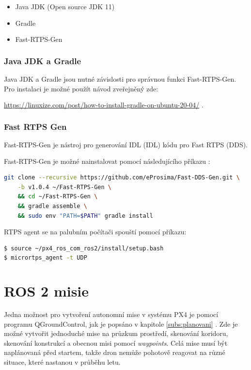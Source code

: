\begin{itemize}
    \item Java JDK (Open source JDK 11)
    \item Gradle
    \item Fast-RTPS-Gen
\end{itemize}

\subsubsection{Java JDK a Gradle}

Java JDK a Gradle jsou nutné závislosti pro správnou funkci Fast-RTPS-Gen. Pro instalaci je možné použít návod zveřejněný zde: 

\href{https://linuxize.com/post/how-to-install-gradle-on-ubuntu-20-04/}{https://linuxize.com/post/how-to-install-gradle-on-ubuntu-20-04/} \cite{GRADLE}.

\subsubsection{Fast RTPS Gen}

Fast-RTPS-Gen je nástroj pro generování \acs{IDL} (\acl{IDL}) kódu pro Fast RTPS (\acs{DDS}).

Fast-RTPS-Gen je možné nainstalovat pomocí následujícího příkazu \cite{DDSGEN}:

\begin{lstlisting}[language=bash]
git clone --recursive https://github.com/eProsima/Fast-DDS-Gen.git \
    -b v1.0.4 ~/Fast-RTPS-Gen \
    && cd ~/Fast-RTPS-Gen \
    && gradle assemble \
    && sudo env "PATH=$PATH" gradle install
\end{lstlisting}

\acs{RTPS} agent se na palubním počítači spouští pomocí příkazu:

\begin{lstlisting}[language=bash]
$ source ~/px4_ros_com_ros2/install/setup.bash
$ micrortps_agent -t UDP
\end{lstlisting}

\section{ROS 2 misie}

Jedna možnost pro vytvoření autonomní mise v systému PX4 je pomocí programu QGroundControl, jak je popsáno v kapitole \ref{subs:planovani} . Zde je možné vytvořit jednoduché mise na průzkum prostředí, skenování koridoru, skenování konstrukcí a obecnou misi pomocí \textit{waypoints}. Celá mise musí být naplánovaná před startem, takže dron nemůže pohotově reagovat na různé situace, které nastanou v průběhu letu. 

